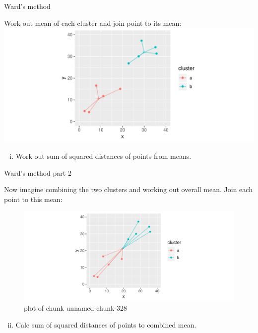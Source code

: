 \documentclass[ignorenonframetext,]{beamer}
\providecommand{\tightlist}{%
  \setlength{\itemsep}{0pt}\setlength{\parskip}{0pt}}
\begin{document}
\begin{frame}{Ward's method}
\protect\hypertarget{wards-method}{}

Work out mean of each cluster and join point to its mean:
\includegraphics{figure/unnamed-chunk-327-1.pdf}

\begin{enumerate}
[(i)]
\tightlist
\item
  Work out sum of squared distances of points from means.
\end{enumerate}

\end{frame}

\begin{frame}{Ward's method part 2}
\protect\hypertarget{wards-method-part-2}{}

Now imagine combining the two clusters and working out overall mean.
Join each point to this mean:

\begin{figure}
\centering
\includegraphics{figure/unnamed-chunk-328-1.pdf}
\caption{plot of chunk unnamed-chunk-328}
\end{figure}

\begin{enumerate}
[(i)]
\setcounter{enumi}{1}
\tightlist
\item
  Calc sum of squared distances of points to combined mean.
\end{enumerate}

\end{frame}
\end{document}
